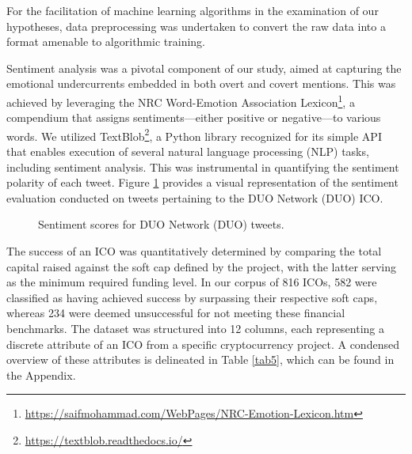 \documentclass[runningheads]{llncs}
\begin{document}
For the facilitation of machine learning algorithms in the examination of our hypotheses, data preprocessing was undertaken to convert the raw data into a format amenable to algorithmic training.


Sentiment analysis was a pivotal component of our study, aimed at capturing the emotional undercurrents embedded in both overt and covert mentions. This was achieved by leveraging the NRC Word-Emotion Association Lexicon\footnote{\url{https://saifmohammad.com/WebPages/NRC-Emotion-Lexicon.htm}}, a compendium that assigns sentiments—either positive or negative—to various words. We utilized TextBlob\footnote{\url{https://textblob.readthedocs.io/}}, a Python library recognized for its simple API that enables execution of several natural language processing (NLP) tasks, including sentiment analysis. This was instrumental in quantifying the sentiment polarity of each tweet. Figure \ref{fig1} provides a visual representation of the sentiment evaluation conducted on tweets pertaining to the DUO Network (DUO) ICO.

\begin{figure}[htbp]
\centering
{}%
\caption{Sentiment scores for DUO Network (DUO) tweets.}
\label{fig1}
\end{figure}



The success of an ICO was quantitatively determined by comparing the total capital raised against the soft cap defined by the project, with the latter serving as the minimum required funding level. In our corpus of 816 ICOs, 582 were classified as having achieved success by surpassing their respective soft caps, whereas 234 were deemed unsuccessful for not meeting these financial benchmarks. The dataset was structured into 12 columns, each representing a discrete attribute of an ICO from a specific cryptocurrency project. A condensed overview of these attributes is delineated in Table \ref{tab5}, which can be found in the Appendix.
\end{document}
